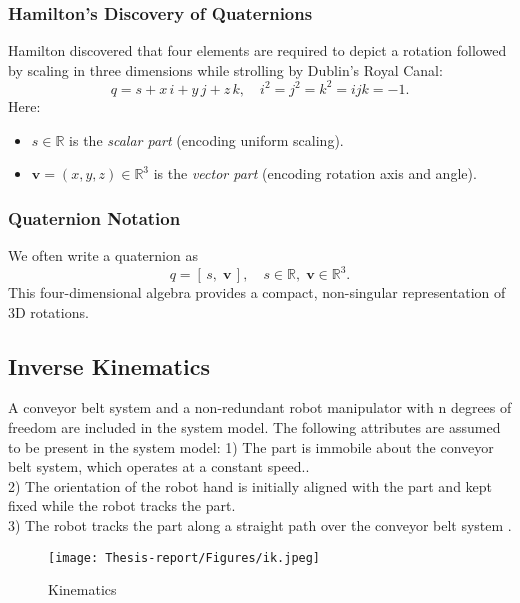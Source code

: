 \documentclass[12pt]{article}
\begin{document}
\subsubsection{Hamilton’s Discovery of Quaternions}
Hamilton discovered that four elements are required to depict a rotation followed by scaling in three dimensions while strolling by Dublin's Royal Canal: \cite{ref20}
\[
  q = s + x\,i + y\,j + z\,k,
  \quad
  i^2 = j^2 = k^2 = ijk = -1.
\]
Here:
\begin{itemize}
  \item $s\in\mathbb{R}$ is the \emph{scalar part} (encoding uniform scaling).
  \item $\mathbf{v} = (x,y,z)\in\mathbb{R}^3$ is the \emph{vector part} (encoding rotation axis and angle).
\end{itemize}

\subsubsection{Quaternion Notation}
We often write a quaternion as
\[
  q = [\,s,\;\mathbf{v}\,],\quad s\in\mathbb{R},\;\mathbf{v}\in\mathbb{R}^3.
\]
This four-dimensional algebra provides a compact, non-singular representation of 3D rotations.

\subsection{Inverse Kinematics}
A conveyor belt system and a non-redundant robot manipulator with n degrees of freedom are included in the system model. The following attributes are assumed to be present in the system model: \cite{ref14}
1) The part is immobile about the conveyor belt system, which operates at a constant speed.\cite{ref14}.\\
2) The orientation of the robot hand is initially aligned with the part and kept fixed while the robot tracks the part\cite{ref14}.\\
3) The robot tracks the part along a straight path over the
conveyor belt system \cite{ref14}.

\begin{figure}[h]
    \centering
    \texttt{[image: Thesis-report/Figures/ik.jpeg]}  
    \caption{Kinematics \cite{ref14}}
    \label{fig:Photoneo Cmaera}
\end{figure}
\end{document}
